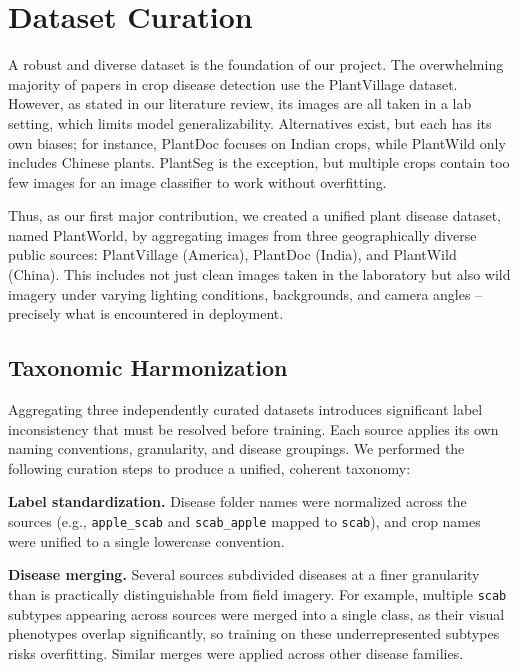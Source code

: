 \documentclass[runningheads]{llncs}
\begin{document}
\section{Dataset Curation}
\label{sec:dataset}

A robust and diverse dataset is the foundation of our project. The overwhelming majority of papers in crop disease detection use the PlantVillage dataset. However, as stated in our literature review, its images are all taken in a lab setting, which limits model generalizability. Alternatives exist, but each has its own biases; for instance, PlantDoc focuses on Indian crops, while PlantWild only includes Chinese plants. PlantSeg is the exception, but multiple crops contain too few images for an image classifier to work without overfitting.

Thus, as our first major contribution, we created a unified plant disease dataset, named PlantWorld, by aggregating images from three geographically diverse public sources: PlantVillage (America), PlantDoc (India), and PlantWild (China). This includes not just clean images taken in the laboratory but also wild imagery under varying lighting conditions, backgrounds, and camera angles -- precisely what is encountered in deployment.

\subsection{Taxonomic Harmonization}

Aggregating three independently curated datasets introduces significant label inconsistency that must be resolved before training. Each source applies its own naming conventions, granularity, and disease groupings. We performed the following curation steps to produce a unified, coherent taxonomy:

\textbf{Label standardization.} Disease folder names were normalized across the sources (e.g., \texttt{apple\_scab} and \texttt{scab\_apple} mapped to \texttt{scab}), and crop names were unified to a single lowercase convention.

\textbf{Disease merging.} Several sources subdivided diseases at a finer granularity than is practically distinguishable from field imagery. For example, multiple \texttt{scab} subtypes appearing across sources were merged into a single class, as their visual phenotypes overlap significantly, so training on these underrepresented subtypes risks overfitting. Similar merges were applied across other disease families.
\end{document}

